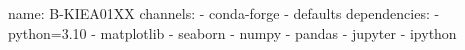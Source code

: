 name: B-KIEA01XX
channels:
  - conda-forge
  - defaults
dependencies:
  - python=3.10
  - matplotlib
  - seaborn
  - numpy
  - pandas
  - jupyter
  - ipython